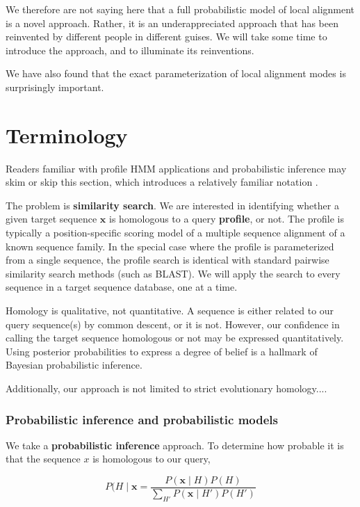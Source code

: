\documentclass[11pt]{article}
\begin{document}
We therefore are not saying here that a full probabilistic model of
local alignment is a novel approach. Rather, it is an underappreciated
approach that has been reinvented by different people in different
guises. We will take some time to introduce the approach, and to
illuminate its reinventions. 

We have also found that the exact parameterization of local alignment
modes is surprisingly important. 


\section{Terminology}

Readers familiar with profile HMM applications and probabilistic
inference may skim or skip this section, which introduces a relatively
familiar notation \citep{Durbin98}.

The problem is \textbf{similarity search}. We are interested in
identifying whether a given target sequence $\mathbf{x}$ is homologous
to a query \textbf{profile}, or not. The profile is typically a
position-specific scoring model of a multiple sequence alignment of a
known sequence family. In the special case where the profile is
parameterized from a single sequence, the profile search is identical
with standard pairwise similarity search methods (such as BLAST).  We
will apply the search to every sequence in a target sequence database,
one at a time.




Homology is qualitative, not quantitative. A sequence is either
related to our query sequence(s) by common descent, or it is not.
However, our confidence in calling the target sequence homologous or
not may be expressed quantitatively. Using posterior probabilities to
express a degree of belief is a hallmark of Bayesian probabilistic
inference.

Additionally, our approach is not limited to strict evolutionary
homology....




\subsubsection{Probabilistic inference and probabilistic models}

We take a \textbf{probabilistic inference} approach. To determine how
probable it is that the sequence $x$ is homologous to our query,

\begin{equation}
   P(H \mid \mathbf{x} = \frac{P(\mathbf{x} \mid H) P(H)}
                           {\sum_{H'} P(\mathbf{x} \mid H') P(H')}
\end{equation}
\end{document}
